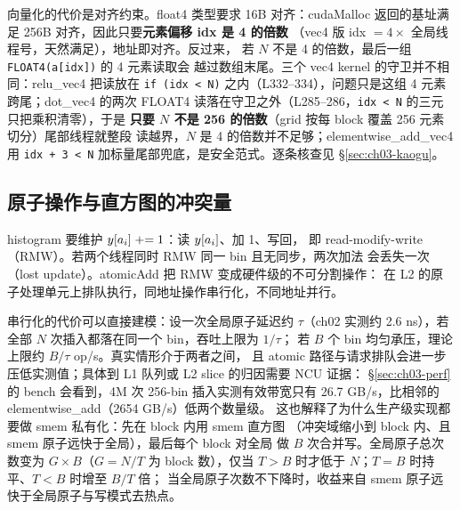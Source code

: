 向量化的代价是对齐约束。float4 类型要求 16B 对齐：cudaMalloc
返回的基址满足 256B 对齐，因此只要\textbf{元素偏移 idx 是 4 的倍数}
（vec4 版 idx $= 4 \times$ 全局线程号，天然满足），地址即对齐。反过来，
若 $N$ 不是 4 的倍数，最后一组 \texttt{FLOAT4\allowbreak{}(a[idx])} 的 4 元素读取会
越过数组末尾。三个 vec4 kernel 的守卫并不相同：relu\_vec4 把读放在
\texttt{if (idx < N)} 之内（L332--334），问题只是这组 4 元素跨尾；dot\_vec4 的两次
FLOAT4 读落在守卫之外（L285--286，\texttt{idx < N} 的三元只把乘积清零），于是
\textbf{只要 $N$ 不是 256 的倍数}（grid 按每 block 覆盖 256 元素切分）尾部线程就整段
读越界，$N$ 是 4 的倍数并不足够；elementwise\_add\_vec4 用 \texttt{idx + 3 < N}
加标量尾部兜底，是安全范式。逐条核查见 \S\ref{sec:ch03-kaogu}。

\subsection{原子操作与直方图的冲突量}

histogram 要维护 $y[a\sb i] \mathrel{+}= 1$：读 $y[a\sb i]$、加 1、写回，
即 read-modify-write（RMW）。若两个线程同时 RMW 同一 bin 且无同步，两次加法
会丢失一次（lost update）。atomicAdd 把 RMW 变成硬件级的不可分割操作：
在 L2 的原子处理单元上排队执行，同地址操作串行化，不同地址并行。

串行化的代价可以直接建模：设一次全局原子延迟约 $\tau$（ch02 实测约
2.6 ns），若全部 $N$ 次插入都落在同一个 bin，吞吐上限为 $1/\tau$；
若 $B$ 个 bin 均匀承压，理论上限约 $B/\tau$ op/s。真实情形介于两者之间，
且 atomic 路径与请求排队会进一步压低实测值；具体到 L1 队列或 L2 slice 的归因需要 NCU 证据：
\S\ref{sec:ch03-perf} 的 bench 会看到，4M 次 256-bin 插入实测有效带宽只有
26.7 GB/s，比相邻的 elementwise\_add（2654 GB/s）低两个数量级。
这也解释了为什么生产级实现都要做 smem 私有化：先在 block 内用 smem 直方图
（冲突域缩小到 block 内、且 smem 原子远快于全局），最后每个 block 对全局
做 $B$ 次合并写。全局原子总次数变为 $G \times B$（$G = N/T$ 为 block
数），仅当 $T > B$ 时才低于 $N$；$T = B$ 时持平、$T < B$ 时增至 $B/T$ 倍；
当全局原子次数不下降时，收益来自 smem 原子远快于全局原子与写模式去热点。


